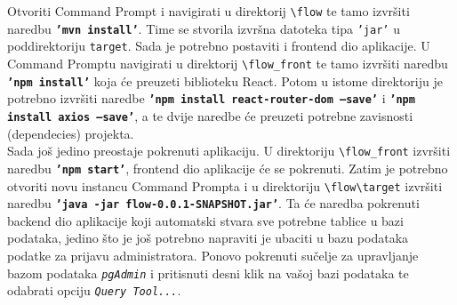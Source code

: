 			Otvoriti Command Prompt i navigirati u direktorij \texttt{\small \textbackslash flow} te tamo izvršiti naredbu \texttt{\textbf{'mvn install'}}. Time se stvorila izvršna datoteka tipa \texttt{'jar'} u poddirektoriju \texttt{\small target}. Sada je potrebno postaviti i frontend dio aplikacije. U Command Promptu navigirati u direktorij \texttt{\small \textbackslash flow\_front} te tamo izvršiti naredbu \texttt{\textbf{'npm install'}} koja će preuzeti biblioteku React. Potom u istome direktoriju je potrebno izvršiti naredbe \texttt{\textbf{'npm install react-router-dom --save'}} i \texttt{\textbf{'npm install axios --save'}}, a te dvije naredbe će preuzeti potrebne zavisnosti (dependecies) projekta.
			\\
			Sada još jedino preostaje pokrenuti aplikaciju. U direktoriju \texttt{\small \textbackslash flow\_front} izvršiti naredbu \texttt{\textbf{'npm start'}}, frontend dio aplikacije će se pokrenuti. Zatim je potrebno otvoriti novu instancu Command Prompta i u direktoriju \texttt{\small \textbackslash flow\textbackslash target} izvršiti naredbu \texttt{\textbf{'java -jar flow-0.0.1-SNAPSHOT.jar'}}. Ta će naredba pokrenuti backend dio aplikacije koji automatski stvara sve potrebne tablice u bazi podataka, jedino što je još potrebno napraviti je ubaciti u bazu podataka podatke za prijavu administratora. Ponovo pokrenuti sučelje za upravljanje bazom podataka \texttt{\textit{pgAdmin}} i pritisnuti desni klik na vašoj bazi podataka te odabrati opciju \texttt{\textit{Query Tool...}}.
			
